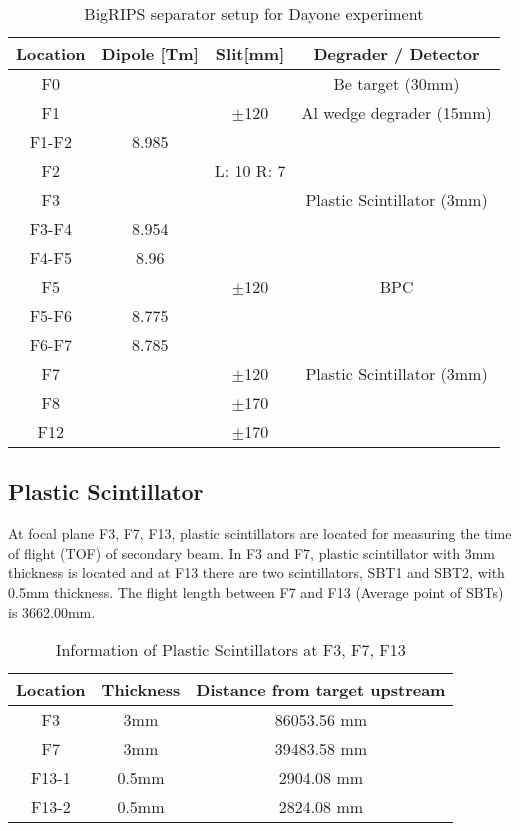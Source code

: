     \begin{table}[h]
        \centering
        \begin{tabular}{c c c c}
            \hline
            Location & Dipole [Tm] & Slit[mm] & Degrader / Detector \\
            \hline
            F0  &  &  & Be target (30mm) \\
            F1  &  & $\pm$120 & Al wedge degrader (15mm)\\
            F1-F2 &   8.985  &  & \\
            F2  &  & L: 10 R: 7 & \\
            F3  &  &  & Plastic Scintillator (3mm)\\
            F3-F4 & 8.954 &  & \\
            F4-F5 & 8.96 &  & \\
            F5  &   & $\pm$120 & BPC \\
            F5-F6 & 8.775  &  & \\
            F6-F7 & 8.785  &  & \\
            F7  &  & $\pm$120 & Plastic Scintillator (3mm)\\
            F8 &  & $\pm$170 & \\
            F12 &  & $\pm$170 & \\
            \hline
        \end{tabular}
        \caption{BigRIPS separator setup for Dayone experiment \cite{Dayonewiki}}
    \end{table}

\subsection{Plastic Scintillator}
At focal plane F3, F7, F13, plastic scintillators are located for measuring the time of flight (TOF) of secondary beam. In F3 and F7, plastic scintillator with 3mm thickness is located and at F13 there are two scintillators, SBT1 and SBT2, with 0.5mm thickness. The flight length between F7 and F13 (Average point of SBTs) is 3662.00mm.

\begin{table}[h]
    \centering
    \begin{tabular}{c|cc}
        \hline
        Location & Thickness & Distance from target upstream \\
        \hline
        F3 & 3mm & 86053.56 mm\\
        F7 & 3mm & 39483.58 mm\\
        F13-1 &0.5mm & 2904.08 mm\\
        F13-2 &0.5mm & 2824.08 mm\\
        \hline
    \end{tabular}
    \caption{Information of Plastic Scintillators at F3, F7, F13}
\end{table}



